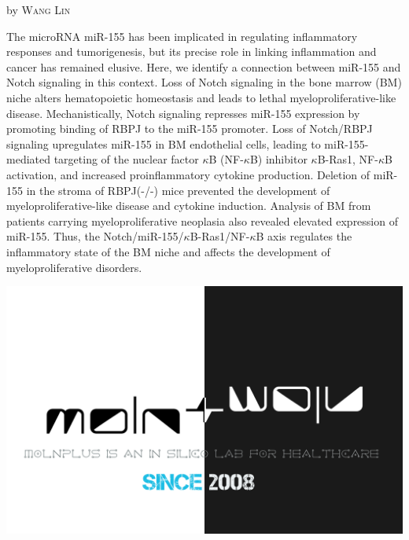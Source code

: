 \documentclass[10pt,a4paper]{article}
\newcommand{\NewsItem}[1]{ %
\usefont{T1}{fvs}{n}{n} %
\vspace{24pt}\large #1\vspace{3pt} %
\par \normalsize \normalfont}
\newcommand{\NewsAuthor}[1]{ %
\hfill by \textsc{#1} \vspace{20pt} %
\par \normalfont}
\begin{document}
\begin{multicols}{2}
\NewsItem{{\color{hugoteal}{Notch-Dependent Repression of miR-155 in the Bone Marrow Niche Regulates Hematopoiesis in an NF-$\kappa$B-Dependent Manner}}}
\NewsAuthor{Wang Lin}

The microRNA miR-155 has been implicated in regulating inflammatory responses and tumorigenesis, but its precise role in linking inflammation and cancer has remained elusive.
Here, we identify a connection between miR-155 and Notch signaling in this context.
Loss of Notch signaling in the bone marrow (BM) niche alters hematopoietic homeostasis and leads to lethal myeloproliferative-like disease.
Mechanistically, Notch signaling represses miR-155 expression by promoting binding of RBPJ to the miR-155 promoter.
Loss of Notch/RBPJ signaling upregulates miR-155 in BM endothelial cells, leading to miR-155-mediated targeting of the nuclear factor $\kappa$B (NF-$\kappa$B) inhibitor $\kappa$B-Ras1, NF-$\kappa$B activation, and increased proinflammatory cytokine production.
Deletion of miR-155 in the stroma of RBPJ(-/-) mice prevented the development of myeloproliferative-like disease and cytokine induction.
Analysis of BM from patients carrying myeloproliferative neoplasia also revealed elevated expression of miR-155.
Thus, the Notch/miR-155/$\kappa$B-Ras1/NF-$\kappa$B axis regulates the inflammatory state of the BM niche and affects the development of myeloproliferative disorders.\cite{wang2014notch}


\begin{center}
\includegraphics[width=0.8\linewidth]{molnplus.png} %
\end{center}



\begin{quotation}


\end{quotation}
\end{multicols}
\end{document}
